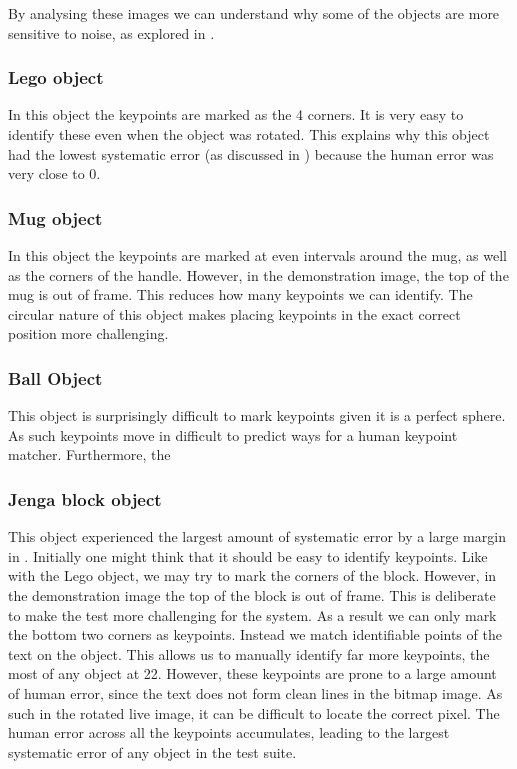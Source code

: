 By analysing these images we can understand why some of the objects are more sensitive to noise, as explored in .

\subsubsection{Lego object}
In this object the keypoints are marked as the 4 corners. It is very easy to identify these even when the object was rotated. This explains why this object had the lowest systematic error (as discussed in ) because the human error was very close to 0.

\subsubsection{Mug object}
In this object the keypoints are marked at even intervals around the mug, as well as the corners of the handle. However, in the demonstration image, the top of the mug is out of frame. This reduces how many keypoints we can identify. The circular nature of this object makes placing keypoints in the exact correct position more challenging.

\subsubsection{Ball Object}
This object is surprisingly difficult to mark keypoints given it is a perfect sphere. As such keypoints move in difficult to predict ways for a human keypoint matcher. Furthermore, the 

\subsubsection{Jenga block object}
This object experienced the largest amount of systematic error by a large margin in . Initially one might think that it should be easy to identify keypoints. Like with the Lego object, we may try to mark the corners of the block. However, in the demonstration image the top of the block is out of frame. This is deliberate to make the test more challenging for the system. As a result we can only mark the bottom two corners as keypoints. Instead we match identifiable points of the text on the object. This allows us to manually identify far more keypoints, the most of any object at 22. However, these keypoints are prone to a large amount of human error, since the text does not form clean lines in the bitmap image. As such in the rotated live image, it can be difficult to locate the correct pixel. The human error across all the keypoints accumulates, leading to the largest systematic error of any object in the test suite.

